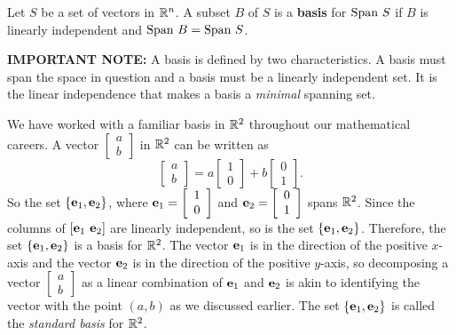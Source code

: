 \begin{definition} \label{def:1_f_basis} Let $S$ be a set of vectors in $\mathbb{R}^n$. A subset $B$ of $S$ is a \textbf{basis} for $\Span \ S$ if $B$ is linearly independent and $\text{Span} \ B = \text{Span} \ S$. 
\end{definition}



\noindent \textbf{IMPORTANT NOTE: } A basis is defined by two characteristics. A basis must span the space in question and a basis must be a linearly independent set. It is the linear independence that makes a basis a \emph{minimal} spanning set. 

We have worked with a familiar basis in $\mathbb{R}^2$ throughout our mathematical careers. A vector $\left[ \begin{array}{c} a \\ b \end{array} \right]$ in $\mathbb{R}^2$ can be written as 
\[\left[ \begin{array}{c} a \\ b \end{array} \right] = a\left[ \begin{array}{c} 1 \\ 0 \end{array} \right] + b\left[ \begin{array}{c} 0 \\ 1 \end{array} \right].\]
So the set $\{\mathbf{e}_1, \mathbf{e}_2\}$, where $\mathbf{e}_1 = \left[ \begin{array}{c} 1 \\ 0 \end{array} \right]$ and $\mathbf{e}_2 = \left[ \begin{array}{c} 0 \\ 1 \end{array} \right]$ spans $\mathbb{R}^2$. Since the columns of $[\mathbf{e}_1 \ \mathbf{e}_2]$ are linearly independent, so is the set $\{\mathbf{e}_1, \mathbf{e}_2\}$. Therefore, the set $\{\mathbf{e}_1, \mathbf{e}_2\}$ is a basis for $\mathbb{R}^2$. The vector $\mathbf{e}_1$ is in the direction of the positive $x$-axis and the vector $\mathbf{e}_2$ is in the direction of the positive $y$-axis, so decomposing a vector $\left[ \begin{array}{c} a \\ b \end{array} \right]$ as a linear combination of $\mathbf{e}_1$ and $\mathbf{e}_2$ is akin to identifying the vector with the point $(a,b)$ as we discussed earlier. The set $\{\mathbf{e}_1, \mathbf{e}_2\}$ is called the \emph{standard basis} for $\mathbb{R}^2$. 

